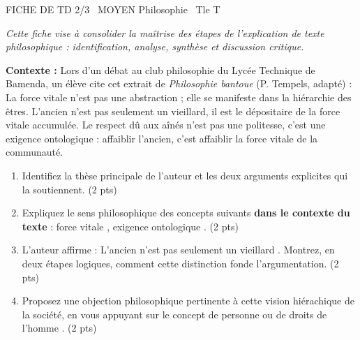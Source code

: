 \documentclass[11pt]{article}
\begin{document}
\begin{tcolorbox}[enhanced,colback=popink,colframe=popink,arc=10pt,boxrule=0pt,left=12pt,right=12pt,top=9pt,bottom=9pt]
{\color{white}\popxbold\small FICHE DE TD 2/3 \textbullet\ MOYEN \hfill Philosophie \textbullet\ Tle T\par}
\end{tcolorbox}
\vspace{4pt}
\noindent \textit{Cette fiche vise à consolider la maîtrise des étapes de l'explication de texte philosophique : identification, analyse, synthèse et discussion critique.}

\begin{exercice}
\textbf{Contexte :} Lors d'un débat au club philosophie du Lycée Technique de Bamenda, un élève cite cet extrait de \textit{Philosophie bantoue} (P. Tempels, adapté) : \og La force vitale n'est pas une abstraction ; elle se manifeste dans la hiérarchie des êtres. L'ancien n'est pas seulement un vieillard, il est le dépositaire de la force vitale accumulée. Le respect dû aux aînés n'est pas une politesse, c'est une exigence ontologique : affaiblir l'ancien, c'est affaiblir la force vitale de la communauté. \fg{}

\begin{enumerate}
    \item Identifiez la thèse principale de l'auteur et les deux arguments explicites qui la soutiennent. (2 pts)
    \item Expliquez le sens philosophique des concepts suivants \textbf{dans le contexte du texte} : \og force vitale \fg, \og exigence ontologique \fg. (2 pts)
    \item L'auteur affirme : \og L'ancien n'est pas seulement un vieillard \fg. Montrez, en deux étapes logiques, comment cette distinction fonde l'argumentation. (2 pts)
    \item Proposez une objection philosophique pertinente à cette vision hiérachique de la société, en vous appuyant sur le concept de \og personne \fg ou de \og droits de l'homme \fg. (2 pts)
\end{enumerate}
\end{exercice}
\end{document}
